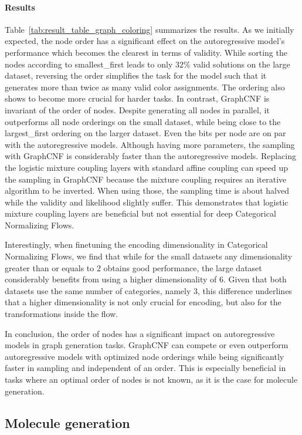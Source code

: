 \paragraph{Results} Table~\ref{tab:result_table_graph_coloring} summarizes the results. 
As we initially expected, the node order has a significant effect on the autoregressive model's performance which becomes the clearest in terms of validity. 
While sorting the nodes according to smallest\_first leads to only $32\%$ valid solutions on the large dataset, reversing the order simplifies the task for the model such that it generates more than twice as many valid color assignments. 
The ordering also shows to become more crucial for harder tasks.
In contrast, GraphCNF is invariant of the order of nodes.
Despite generating all nodes in parallel, it outperforms all node orderings on the small dataset, while being close to the largest\_first ordering on the larger dataset. 
Even the bits per node are on par with the autoregressive models.
Although having more parameters, the sampling with GraphCNF is considerably faster than the autoregressive models.
Replacing the logistic mixture coupling layers with standard affine coupling can speed up the sampling in GraphCNF because the mixture coupling requires an iterative algorithm to be inverted.
When using those, the sampling time is about halved while the validity and likelihood slightly suffer. 
This demonstrates that logistic mixture coupling layers are beneficial but not essential for deep Categorical Normalizing Flows.

Interestingly, when finetuning the encoding dimensionality in Categorical Normalizing Flows, we find that while for the small datasets any dimensionality greater than or equals to $2$ obtains good performance, the large dataset considerably benefits from using a higher dimensionality of $6$. 
Given that both datasets use the same number of categories, namely $3$, this difference underlines that a higher dimensionality is not only crucial for encoding, but also for the transformations inside the flow.

In conclusion, the order of nodes has a significant impact on autoregressive models in graph generation tasks. GraphCNF can compete or even outperform autoregressive models with optimized node orderings while being significantly faster in sampling and independent of an order. This is especially beneficial in tasks where an optimal order of nodes is not known, as it is the case for molecule generation. 

\subsection{Molecule generation}
\label{sec:experiments_molecule_generation}

